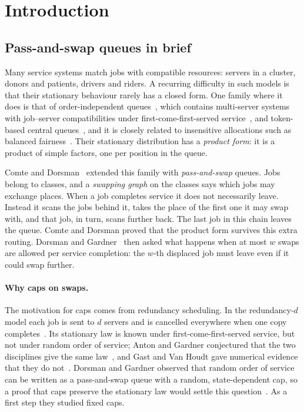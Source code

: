 \documentclass[11pt,a4paper]{article}
\theoremstyle{plain}
\theoremstyle{plain}
\begin{document}
\tableofcontents

\section{Introduction}\label{sec:intro}

\subsection{Pass-and-swap queues in brief}

Many service systems match jobs with compatible resources: servers in a cluster, donors and patients, drivers and riders. A recurring difficulty in such models is that their stationary behaviour rarely has a closed form. One family where it does is that of order-independent queues~\cite{BKK1995,Krz2011}, which contains multi-server systems with job--server compatibilities under first-come-first-served service~\cite{VAW2012,GR2020}, and token-based central queues~\cite{ABDV2022}, and it is closely related to insensitive allocations such as balanced fairness~\cite{BP2003}. Their stationary distribution has a \emph{product form}: it is a product of simple factors, one per position in the queue.

Comte and Dorsman~\cite{CD2021} extended this family with \emph{pass-and-swap} queues. Jobs belong to classes, and a \emph{swapping graph} on the classes says which jobs may exchange places. When a job completes service it does not necessarily leave. Instead it scans the jobs behind it, takes the place of the first one it may swap with, and that job, in turn, scans further back. The last job in this chain leaves the queue. Comte and Dorsman proved that the product form survives this extra routing. Dorsman and Gardner~\cite{DG2024} then asked what happens when at most $w$ swaps are allowed per service completion: the $w$-th displaced job must leave even if it could swap further.

\paragraph{Why caps on swaps.} The motivation for caps comes from redundancy scheduling. In the redundancy-$d$ model each job is sent to $d$ servers and is cancelled everywhere when one copy completes~\cite{GZDHHS2016,GHSVZ2017,ABV2018}. Its stationary law is known under first-come-first-served service, but not under random order of service; Anton and Gardner conjectured that the two disciplines give the same law~\cite{AG2023}, and Gast and Van Houdt gave numerical evidence that they do not~\cite{GVH2024}. Dorsman and Gardner observed that random order of service can be written as a pass-and-swap queue with a random, state-dependent cap, so a proof that caps preserve the stationary law would settle this question~\cite[Section~5]{DG2024}. As a first step they studied fixed caps.
\end{document}
